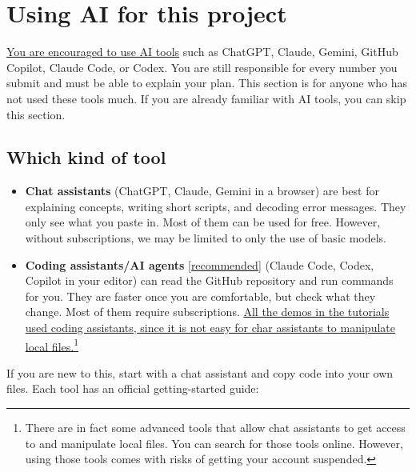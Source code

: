 \documentclass[10pt]{article}
\newcommand{\alert}[1]{{\color{alertblue}\uline{#1}}}
\begin{document}
\section{Using AI for this project}\label{sec:ai}

\alert{You are encouraged to use AI tools} such as ChatGPT, Claude, Gemini, GitHub
Copilot, Claude Code, or Codex. You are still responsible for every number you
submit and must be able to explain your plan. This section is for anyone who
has not used these tools much. If you are already familiar with AI tools, you can skip this section.

\subsection{Which kind of tool}
\begin{itemize}[leftmargin=*]
  \item \textbf{Chat assistants} (ChatGPT, Claude, Gemini in a browser) are best
    for explaining concepts, writing short scripts, and decoding error
    messages. They only see what you paste in. Most of them can be used for free. However, without subscriptions, we may be limited to only the use of basic models.
  \item \textbf{Coding assistants/AI agents} \alert{[recommended]} (Claude Code, Codex, Copilot in your editor)
    can read the GitHub repository and run commands for you. They are faster once you
    are comfortable, but check what they change. Most of them require subscriptions. \alert{All the demos in the tutorials used coding assistants, since it is not easy for char assistants to manipulate local files.}\footnote{There are in fact some advanced tools that allow chat assistants to get access to and manipulate local files. You can search for those tools online. However, using those tools comes with risks of getting your account suspended.}
\end{itemize}
If you are new to this, start with a chat assistant and copy code into your
own files. Each tool has an official getting-started guide:
\end{document}
